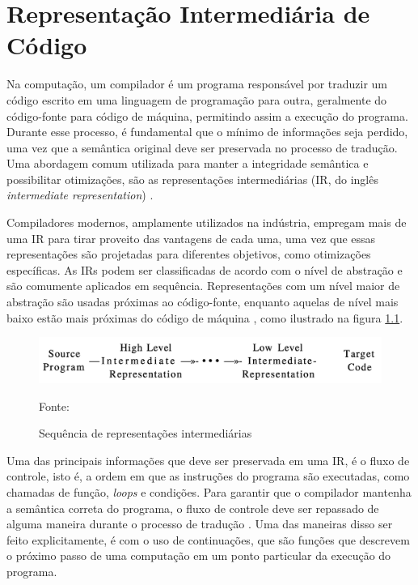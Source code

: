 \chapter{Representação Intermediária de Código}\label{ch:IR}

Na computação, um compilador é um programa responsável por traduzir um código escrito em uma linguagem de programação para outra, geralmente do código-fonte para código de máquina, permitindo assim a execução do programa.
Durante esse processo, é fundamental que o mínimo de informações seja perdido, uma vez que a semântica original deve ser preservada no processo de tradução.
Uma abordagem comum utilizada para manter a integridade semântica e possibilitar otimizações, são as representações intermediárias (IR, do inglês \textit{intermediate representation}) \cite{cooper2014}.

Compiladores modernos, amplamente utilizados na indústria, empregam mais de uma IR para tirar proveito das vantagens de cada uma, uma vez que essas representações são projetadas para diferentes objetivos, como otimizações específicas.
As IRs podem ser classificadas de acordo com o nível de abstração e são comumente aplicados em sequência.
Representações com um nível maior de abstração são usadas próximas ao código-fonte, enquanto aquelas de nível mais baixo estão mais próximas do código de máquina \cite{aho2008compilers}, como ilustrado na figura \ref{fig:abstraction-level-irs}.

\begin{figure}
  \centering
  \includegraphics[width=.7\textwidth]{Imagens/abstraction-level-irs.png}
  \caption{Sequência de representações intermediárias}
  \label{fig:abstraction-level-irs}
  \small{Fonte: \cite{aho2008compilers}}
\end{figure}

Uma das principais informações que deve ser preservada em uma IR, é o fluxo de controle, isto é, a ordem em que as instruções do programa são executadas, como chamadas de função, \textit{loops} e condições.
Para garantir que o compilador mantenha a semântica correta do programa, o fluxo de controle deve ser repassado de alguma maneira durante o processo de tradução \cite{cooper2014}.
Uma das maneiras disso ser feito explicitamente, é com o uso de continuações, que são funções que descrevem o próximo passo de uma computação em um ponto particular da execução do programa.

